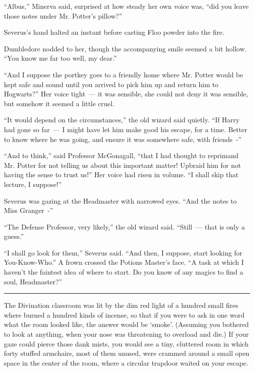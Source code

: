 ``Albus,'' Minerva said, surprised at how steady her own voice was, ``did you leave those notes under Mr. Potter's pillow?''

Severus's hand halted an instant before casting Floo powder into the fire.

Dumbledore nodded to her, though the accompanying smile seemed a bit hollow. ``You know me far too well, my dear.''

``And I suppose the portkey goes to a friendly home where Mr. Potter would be kept safe and sound until you arrived to pick him up and return him to Hogwarts?'' Her voice tight~--- it was sensible, she could not deny it was sensible, but somehow it seemed a little cruel.

``It would depend on the circumstances,'' the old wizard said quietly. ``If Harry had gone so far~--- I might have let him make good his escape, for a time. Better to know where he was going, and ensure it was somewhere safe, with friends~-''

``And to think,'' said Professor McGonagall, ``that I had thought to reprimand Mr. Potter for not telling us about this important matter! Upbraid him for not having the sense to trust us!'' Her voice had risen in volume. ``I shall skip that lecture, I suppose!''

Severus was gazing at the Headmaster with narrowed eyes. ``And the notes to Miss Granger~-''

``The Defense Professor, very likely,'' the old wizard said. ``Still~--- that is only a guess.''

``I shall go look for them,'' Severus said. ``And then, I suppose, start looking for You-Know-Who.'' A frown crossed the Potions Master's face. ``A task at which I haven't the faintest idea of where to start. Do you know of any magics to find a soul, Headmaster?''

\begin{center}\rule{3in}{0.4pt}\end{center}

The Divination classroom was lit by the dim red light of a hundred small fires where burned a hundred kinds of incense, so that if you were to ask in one word what the room looked like, the answer would be `smoke'. (Assuming you bothered to look at anything, when your nose was threatening to overload and die.) If your gaze could pierce those dank mists, you would see a tiny, cluttered room in which forty stuffed armchairs, most of them unused, were crammed around a small open space in the center of the room, where a circular trapdoor waited on your escape.

